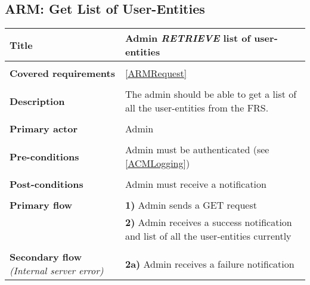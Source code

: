 \documentclass[a4paper,11pt]{article}
\begin{document}
\subsection{ARM: Get List of User-Entities}

\begin{tabular}{|p{3.5cm}|p{11.5cm}|} \hline
    \textbf{Title} &   Admin \emph{RETRIEVE} list of user-entities

    \\ \hline \rowcolor{Gray} & \\ \hline

    \textbf{Covered requirements} &  \ref{ARMRequest}

    \\ \hline \rowcolor{Gray} & \\ \hline

    \textbf{Description} &  The admin should be able to get a list of all the user-entities from the FRS.

    \\ \hline \rowcolor{Gray} & \\ \hline

    \textbf{Primary actor} & Admin

    \\ \hline \rowcolor{Gray} & \\ \hline

    \textbf{Pre-conditions} &   Admin must be authenticated (see \ref{ACMLogging})

    \\ \hline \rowcolor{Gray} & \\ \hline

    \textbf{Post-conditions} &   Admin must receive a notification
                
    \\ \hline \rowcolor{Gray} & \\ \hline 
         
    \textbf{Primary flow} & 
    \textbf{1)} Admin sends a GET request \\&
    \textbf{2)} Admin receives a success notification and list of all the user-entities currently
        
    \\ \hline \rowcolor{Gray} & \\ \hline 
         
    \textbf{Secondary flow} \emph{(Internal server error)} & 
    \textbf{2a)} Admin receives a failure notification
    
    \\ \hline 
\end{tabular}
\end{document}
